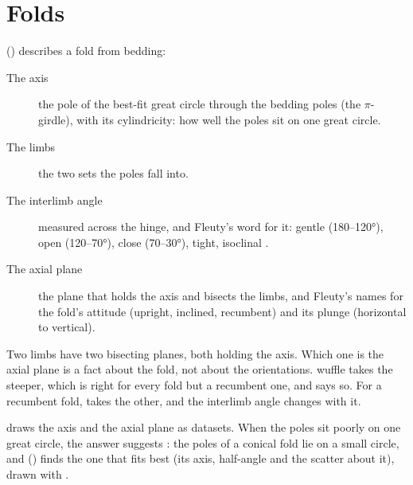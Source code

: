 \section{Folds}\label{sec:fold}

 () describes a fold from bedding:

\begin{description}
\item[The axis] the pole of the best-fit great circle through the bedding poles (the $\pi$-girdle), with
its cylindricity: how well the poles sit on one great circle.
\item[The limbs] the two sets the poles fall into.
\item[The interlimb angle] measured across the hinge, and Fleuty's word for it: gentle (180–120°), open
(120–70°), close (70–30°), tight, isoclinal \parencite{fleuty1964}.
\item[The axial plane] the plane that holds the axis and bisects the limbs, and Fleuty's names for the
fold's attitude (upright, inclined, recumbent) and its plunge (horizontal to vertical).
\end{description}

\begin{caution}
Two limbs have two bisecting planes, both holding the axis. Which one is the axial plane is a fact about
the fold, not about the orientations. wuffle takes the steeper, which is right for every fold but a
recumbent one, and says so. For a recumbent fold,  takes the other, and the
interlimb angle changes with it.
\end{caution}

\noindent {} draws the axis and the axial plane as datasets. When the poles sit poorly on
one great circle, the answer suggests : the poles of a conical fold lie on a small circle, and
 () finds the one that fits best (its axis, half-angle and the
scatter about it), drawn with .
